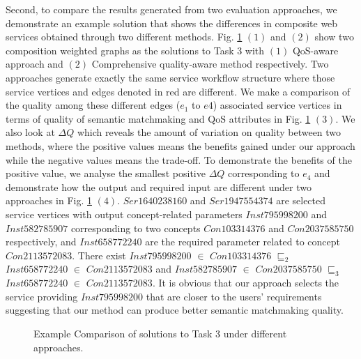 \documentclass{IEEEtran}
\begin{document}
Second, to compare the results generated from two evaluation approaches, we demonstrate an example solution that shows the differences in composite web services obtained through two different methods. Fig. \ref{comparisontest} $(1)$ and $(2)$ show two composition weighted graphs as the solutions to Task 3 with $(1)$ QoS-aware approach and $(2)$ Comprehensive quality-aware method respectively. Two approaches generate exactly the same service workflow structure where those service vertices and edges denoted in red are different. We make a comparison of the quality among these different edges ($e_1$ to $e4$) associated service vertices in terms of quality of semantic matchmaking and QoS attributes in Fig. \ref{comparisontest} $(3)$. We also look at $\Delta Q$ which reveals the amount of variation on quality between two methods, where the positive values means the benefits gained under our approach while the negative values means the trade-off. To demonstrate the benefits of the positive value, we analyse the smallest positive $\Delta Q$ corresponding to $e_4$ and demonstrate how the output and required input are different under two approaches in Fig. \ref{comparisontest} $(4)$. $Ser1640238160$ and $Ser1947554374$ are selected service vertices with output concept-related parameters $Inst795998200$ and $Inst582785907$ corresponding to two concepts $Con103314376$ and $Con2037585750$ respectively, and $Inst658772240$ are the required parameter related to concept $Con2113572083$. There exist $Inst795998200$ $\in$ $Con103314376$ $\sqsubseteq_{2}$ $Inst658772240$ $\in$ $Con2113572083$ and $Inst582785907$ $\in$ $Con2037585750$ $\sqsubseteq_{3}$ $Inst658772240$ $\in$ $Con2113572083$. It is obvious that our approach selects the service providing $Inst795998200$ that are closer to the users' requirements suggesting that our method can produce better semantic matchmaking quality.

\begin{figure}[h]
 \caption{Example Comparison of solutions to Task 3 under different approaches.}
 \label{comparisontest}
\end{figure}
\end{document}
